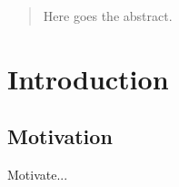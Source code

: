 \begin{abstract}
Here goes the abstract.
\end{abstract}

\section{Introduction}
\subsection{Motivation}

Motivate...
